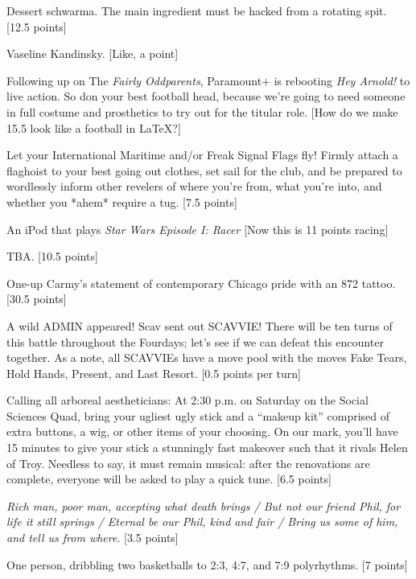 \documentclass{book}
\begin{document}
\begin{list}{}{}
\newpage
\item Dessert schwarma. The main ingredient must be hacked from a rotating spit. [12.5 points]
\item Vaseline Kandinsky. [Like, a point]
\item Following up on The \textit{Fairly Oddparents}, Paramount$+$ is rebooting \textit{Hey Arnold!} to live action. So don your best football head, because we're going to need someone in full costume and prosthetics to try out for the titular role. [How do we make 15.5 look like a football in \LaTeX?]
\item Let your International Maritime and/or Freak Signal Flags fly! Firmly attach a flaghoist to your best going out clothes, set sail for the club, and be prepared to wordlessly inform other revelers of where you're from, what you're into, and whether you *ahem* require a tug. [7.5 points]
\item An iPod that plays \textit{Star Wars Episode I: Racer} [Now this is 11 points racing]
\item TBA. [10.5 points] %
\item One-up Carmy's statement of contemporary Chicago pride with an 872 tattoo. [30.5 points]
\item A wild ADMIN appeared! Scav sent out SCAVVIE! There will be ten turns of this battle throughout the Fourdays; let's see if we can defeat this encounter together. As a note, all SCAVVIEs have a move pool with the moves Fake Tears, Hold Hands, Present, and Last Resort. [0.5 points per turn]
\item Calling all arboreal aestheticians: At 2:30 p.m. on Saturday on the Social Sciences Quad, bring your ugliest ugly stick and a “makeup kit” comprised of extra buttons, a wig, or other items of your choosing. On our mark, you'll have 15 minutes to give your stick a stunningly fast makeover such that it rivals Helen of Troy. Needless to say, it must remain musical: after the renovations are complete, everyone will be asked to play a quick tune. [6.5 points]
\item \textit{Rich man, poor man, accepting what death brings / But not our friend Phil, for life it still springs / Eternal be our Phil, kind and fair / Bring us some of him, and tell us from where}. [3.5 points]
\item One person, dribbling two basketballs to 2:3, 4:7, and 7:9 polyrhythms. [7 points]

\end{list}
\end{document}

